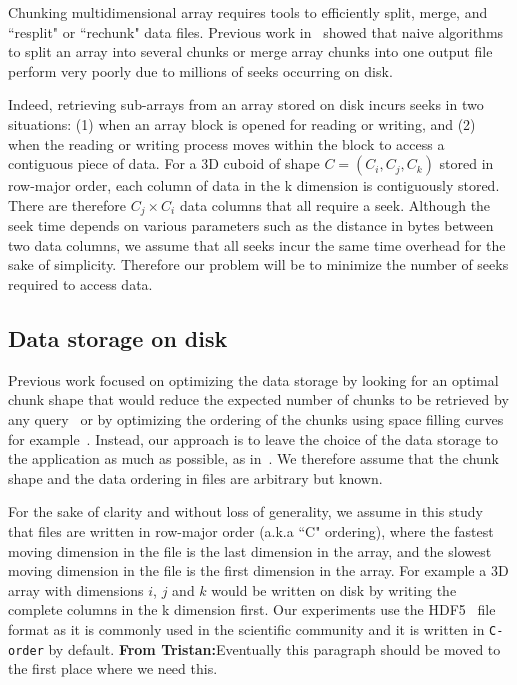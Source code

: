 \documentclass[conference]{IEEEtran}
\newcommand{\tristan}[1]{\color{orange}\textbf{From Tristan:}#1\color{black}}
\begin{document}
Chunking multidimensional array requires tools to efficiently split,
merge, and ``resplit" or ``rechunk" data files. Previous work in~\cite{seqalgorithms}
showed that naive algorithms to split an array into several chunks or merge
array chunks into one output file perform very poorly due to millions of seeks
occurring on disk.

Indeed, retrieving sub-arrays from an array stored on disk incurs seeks in two situations: (1) when an array block
is opened for reading or writing, and (2) when the reading or writing process
moves within the block to access a contiguous piece of data. For a 3D cuboid of shape $C = (C_i, C_j, C_k)$
 stored in row-major order,
each column of data in the k dimension is contiguously stored. There are therefore
$C_j \times C_i$ data columns that all require a seek. Although the seek
time depends on various parameters such as the distance in bytes between two
data columns, we assume that all seeks incur the same time overhead for the sake
of simplicity. Therefore our problem will be to minimize the number of seeks
required to access data.

\subsection{Data storage on disk}
Previous work focused on optimizing the data storage by looking for an optimal
chunk shape that would reduce the expected number of chunks to be retrieved by
any query~\cite{optimal_chuking} or by optimizing the ordering of the chunks
using space filling curves for example~\cite{optimal_chuking, openconnectomecluster}.
Instead, our approach is to leave the choice of the
data storage to the application as much as possible, as in~\cite{seqalgorithms}. We therefore assume that
the chunk shape and the data ordering in files are arbitrary but known.

For the sake of clarity and without loss of generality,
 we assume in this study that files are written in row-major order (a.k.a
``C" ordering), where the fastest moving dimension in the file is the last
dimension in the array, and the slowest moving dimension in the file is the first
dimension in the array. For example a 3D array with dimensions $i$, $j$ and $k$
would be written on disk by writing the complete columns in the k dimension first.
Our experiments use the HDF5~\cite{hdf5} file format as it is commonly used in the
scientific community and it is written in \texttt{C-order} by default.
\tristan{Eventually this paragraph should be moved to the first place where we need this.}
\end{document}
